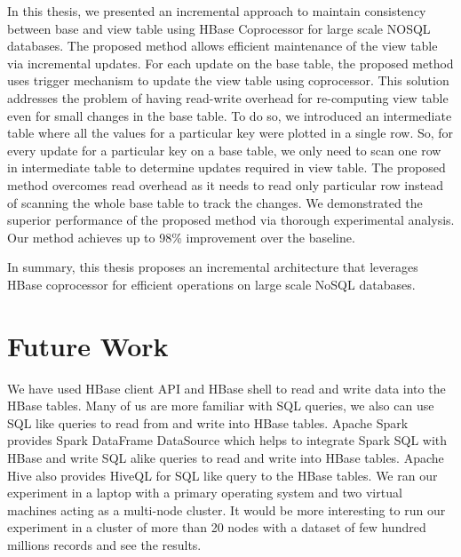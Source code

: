 \documentclass[11pt,a4paper,bibtotoc,idxtotoc,headsepline,footsepline,footexclude,BCOR12mm,DIV13]{scrbook}
\begin{document}
In this thesis, we presented an incremental approach to maintain consistency between base and view table using HBase Coprocessor for large scale NOSQL databases. The proposed method allows efficient maintenance of the view table via incremental updates. For each update on the base table, the proposed method uses trigger mechanism to update the view table using coprocessor. This solution addresses the problem of having read-write overhead for re-computing view table even for small changes in the base table. To do so, we introduced an intermediate table where all the values for a particular key were plotted in a single row. So, for every update for a particular key on a base table, we only need to scan one row in intermediate table to determine updates required in view table. The proposed method overcomes read overhead as it needs to read only particular row instead of scanning the whole base table to track the changes. We demonstrated the superior performance of the proposed method via thorough experimental analysis. Our method achieves up to 98\%  improvement over the baseline.  

In summary, this thesis proposes an incremental architecture that leverages HBase coprocessor for efficient operations on large scale NoSQL databases.




\chapter{Future Work}
\label{Future Work}
We have used HBase client API and HBase shell to read and write data into the HBase tables. Many of us are more familiar with SQL queries, we also can use SQL like queries to read from and write into HBase tables. Apache Spark provides Spark DataFrame DataSource which helps to integrate Spark SQL with HBase and write SQL alike queries to read and write into HBase tables. Apache Hive also provides HiveQL for SQL like query to the HBase tables. 
\newline
We ran our experiment in a laptop with a primary operating system and two virtual machines acting as a multi-node cluster. It would be more interesting to run our experiment in a cluster of more than 20 nodes with a dataset of few hundred millions records and see the results.


\cleardoublepage
{}
{}
\listoffigures
\cleardoublepage
{}
{}
\listoftables
\cleardoublepage
{}

\end{document}
